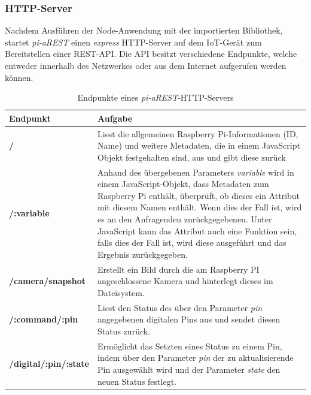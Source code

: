 \subsubsection{HTTP-Server}
Nachdem Ausführen der Node-Anwendung mit der importierten Bibliothek, startet \textit{pi-aREST} einen 
\textit{express} HTTP-Server auf dem IoT-Gerät zum Bereitstellen einer REST-API. Die API besitzt
verschiedene Endpunkte, welche entweder innerhalb des Netzwerkes oder aus dem Internet aufgerufen werden
können.  \cite{piarestgtihub}

\begin{table}[t]
  \centering
  \label{tab:security-threats}
  \begin{tabularx}{\textwidth}{lX}
    \textbf{Endpunkt} & \textbf{Aufgabe}\\
    \hline
    \textbf{/} & Liest die allgemeinen Raspberry Pi-Informationen (ID, Name) und weitere
		    Metadaten, die in einem JavaScript Objekt festgehalten sind, aus und gibt 
		   diese zurück  \\

    \textbf{/:variable} & Anhand des übergebenen Parameters \textit{variable} wird in einem 
				JavaScript-Objekt, dass Metadaten zum Raspberry Pi enthält, überprüft, ob dieses ein
				Attribut mit diesem Namen enthält. Wenn dies der Fall ist, wird es an den
				Anfragenden zurückgegebenen. Unter JavaScript kann das Attribut auch
				eine Funktion sein, falls dies der Fall ist, wird diese ausgeführt und das 
				Ergebnis zurückgegeben. \\

    \textbf{/camera/snapshot} & Erstellt ein Bild durch die am Raspberry PI angeschlossene Kamera 
					     und hinterlegt dieses im Dateisystem.  \\

    \textbf{/:command/:pin} & Liest den Status des über den Parameter \textit{pin} angegebenen digitalen
					Pins aus und sendet diesen Status zurück.   \\

    \textbf{/digital/:pin/:state} & Ermöglicht das Setzten eines Status zu einem Pin, indem über den Parameter 
					\textit{pin} der zu aktualisierende Pin ausgewählt wird und der Parameter
					\textit{state} den neuen Status festlegt.  \\
  \end{tabularx}
  \caption{Endpunkte eines \textit{pi-aREST}-HTTP-Servers \cite{piarestgtihub}}
\end{table}

